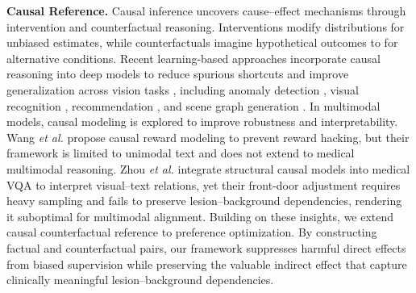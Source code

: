 \noindent\textbf{Causal Reference.}
Causal inference \cite{pearl2009causality} uncovers cause–effect mechanisms through intervention and counterfactual reasoning.
Interventions modify distributions for unbiased estimates, while counterfactuals imagine hypothetical outcomes to for alternative conditions.
Recent learning-based approaches incorporate causal reasoning into deep models to reduce spurious shortcuts and improve generalization across vision tasks \cite{shao2024knowledge,li2024multimodal,zhou2025learning}, including anomaly detection \cite{liu2025crcl}, visual recognition \cite{liu2022contextual}, recommendation \cite{wang2022causal,wei2022causal}, and scene graph generation \cite{liu2025causal}.
In multimodal models, causal modeling is explored to improve robustness and interpretability.
Wang \textit{et al.} \cite{wang2025beyond} propose causal reward modeling to prevent reward hacking, but their framework is limited to unimodal text and does not extend to medical multimodal reasoning.
Zhou \textit{et al.} \cite{xu2025structure} integrate structural causal models into medical VQA to interpret visual–text relations, yet their front-door adjustment requires heavy sampling and fails to preserve lesion–background dependencies, rendering it suboptimal for multimodal alignment.
Building on these insights, we extend causal counterfactual reference to preference optimization. 
By constructing factual and counterfactual pairs, our framework suppresses harmful direct effects from biased supervision while preserving the valuable indirect effect that capture clinically meaningful lesion–background dependencies.




\iffalse
